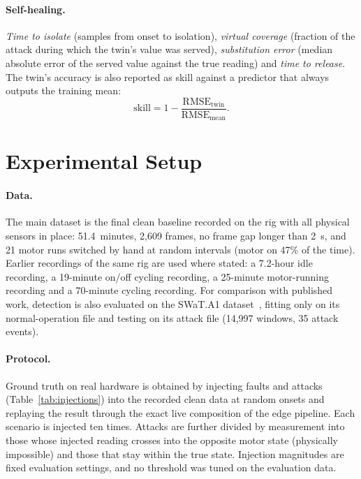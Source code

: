 \paragraph{Self-healing.} \emph{Time to isolate} (samples from onset to isolation), \emph{virtual coverage} (fraction of the attack during which the twin's value was served), \emph{substitution error} (median absolute error of the served value against the true reading) and \emph{time to release}. The twin's accuracy is also reported as skill against a predictor that always outputs the training mean:
\begin{equation}
\mathrm{skill} = 1 - \frac{\mathrm{RMSE}_{\mathrm{twin}}}{\mathrm{RMSE}_{\mathrm{mean}}}.
\end{equation}

\section{Experimental Setup}

\paragraph{Data.} The main dataset is the final clean baseline recorded on the rig with all physical sensors in place: 51.4~minutes, 2,609 frames, no frame gap longer than 2~s, and 21 motor runs switched by hand at random intervals (motor on 47\% of the time). Earlier recordings of the same rig are used where stated: a 7.2-hour idle recording, a 19-minute on/off cycling recording, a 25-minute motor-running recording and a 70-minute cycling recording. For comparison with published work, detection is also evaluated on the SWaT.A1 dataset~\cite{goh2016swat}, fitting only on its normal-operation file and testing on its attack file (14,997 windows, 35 attack events).

\paragraph{Protocol.} Ground truth on real hardware is obtained by injecting faults and attacks (Table~\ref{tab:injections}) into the recorded clean data at random onsets and replaying the result through the exact live composition of the edge pipeline. Each scenario is injected ten times. Attacks are further divided by measurement into those whose injected reading crosses into the opposite motor state (physically impossible) and those that stay within the true state. Injection magnitudes are fixed evaluation settings, and no threshold was tuned on the evaluation data.

